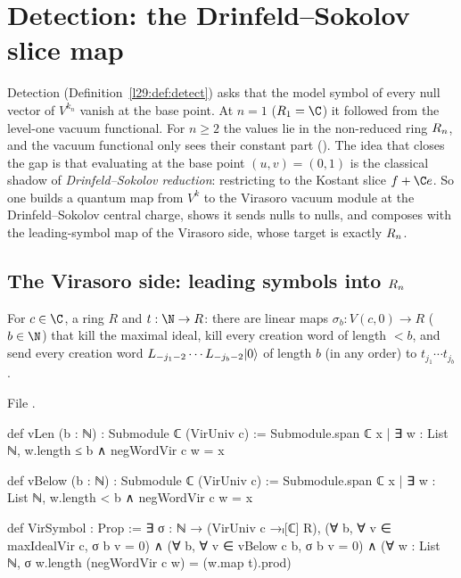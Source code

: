 \section{Detection: the Drinfeld--Sokolov slice map}\label{l29:sec:ds}

Detection (Definition~\ref{l29:def:detect}) asks that the model symbol of every null vector of $V^{k_n}$ vanish at the
base point. At $n=1$ ($R_1=\C$) it followed from the level-one vacuum functional. For $n\ge2$ the values lie in the
non-reduced ring $R_n$, and the vacuum functional only sees their constant part ().
The idea that closes the gap is that evaluating at the base point $(u,v)=(0,1)$ is the classical shadow of
\emph{Drinfeld--Sokolov reduction}: restricting to the Kostant slice $f+\C e$. So one builds a quantum map from
$V^{k}$ to the Virasoro vacuum module at the Drinfeld--Sokolov central charge, shows it sends nulls to nulls, and
composes with the leading-symbol map of the Virasoro side, whose target is exactly $R_n$.

\subsection{The Virasoro side: leading symbols into $R_n$}

\begin{definition}\label{l29:def:virsymbol}
For $c\in\C$, a ring $R$ and $t:\N\to R$: there are linear maps $\sigma_b:V(c,0)\to R$ ($b\in\N$) that kill the
maximal ideal, kill every creation word of length $<b$, and send every creation word
$L_{-j_1-2}\cdots L_{-j_b-2}|0\rangle$ of length $b$ (in any order) to $t_{j_1}\cdots t_{j_b}$.
\end{definition}

\noindent File .
\begin{leancode}
def vLen (b : ℕ) : Submodule ℂ (VirUniv c) :=
  Submodule.span ℂ {x | ∃ w : List ℕ, w.length ≤ b ∧ negWordVir c w = x}

def vBelow (b : ℕ) : Submodule ℂ (VirUniv c) :=
  Submodule.span ℂ {x | ∃ w : List ℕ, w.length < b ∧ negWordVir c w = x}

def VirSymbol : Prop :=
  ∃ σ : ℕ → (VirUniv c →ₗ[ℂ] R),
    (∀ b, ∀ v ∈ maxIdealVir c, σ b v = 0) ∧
    (∀ b, ∀ v ∈ vBelow c b, σ b v = 0) ∧
    (∀ w : List ℕ, σ w.length (negWordVir c w) = (w.map t).prod)
\end{leancode}

